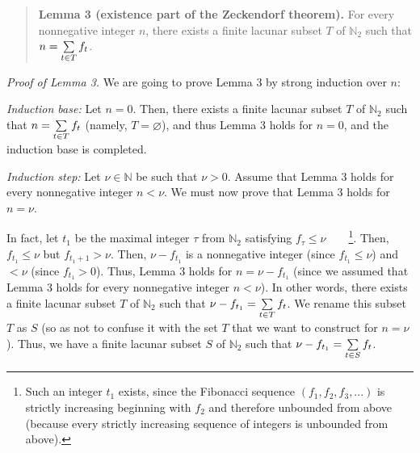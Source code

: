 \documentclass[numbers=enddot,12pt,final,onecolumn,notitlepage]{scrartcl}%
\numberwithin{exer}{section}
\theoremstyle{definition}
\let\sumnonlimits\sum
\renewcommand{\sum}{\sumnonlimits\limits}
\begin{document}
\begin{quote}
\textbf{Lemma 3 (existence part of the Zeckendorf theorem).} For every
nonnegative integer $n$, there exists a finite lacunar subset $T$ of
$\mathbb{N}_{2}$ such that $n=\sum\limits_{t\in T}f_{t}$.
\end{quote}

\textit{Proof of Lemma 3.} We are going to prove Lemma 3 by strong induction
over $n$:

\textit{Induction base:} Let $n=0$. Then, there exists a finite lacunar subset
$T$ of $\mathbb{N}_{2}$ such that $n=\sum\limits_{t\in T}f_{t}$ (namely,
$T=\varnothing$), and thus Lemma 3 holds for $n=0$, and the induction base is completed.

\textit{Induction step:} Let $\nu\in\mathbb{N}$ be such that $\nu>0$. Assume
that Lemma 3 holds for every nonnegative integer $n<\nu$. We must now prove
that Lemma 3 holds for $n=\nu$.

In fact, let $t_{1}$ be the maximal integer $\tau$ from $\mathbb{N}_{2}$
satisfying $f_{\tau}\leq\nu$\ \ \ \ \footnote{Such an integer $t_{1}$ exists,
since the Fibonacci sequence $\left(  f_{1},f_{2},f_{3},...\right)  $ is
strictly increasing beginning with $f_{2}$ and therefore unbounded from above
(because every strictly increasing sequence of integers is unbounded from
above).}. Then, $f_{t_{1}}\leq\nu$ but $f_{t_{1}+1}>\nu$. Then, $\nu-f_{t_{1}%
}$ is a nonnegative integer (since $f_{t_{1}}\leq\nu$) and $<\nu$ (since
$f_{t_{1}}>0$). Thus, Lemma 3 holds for $n=\nu-f_{t_{1}}$ (since we assumed
that Lemma 3 holds for every nonnegative integer $n<\nu$). In other words,
there exists a finite lacunar subset $T$ of $\mathbb{N}_{2}$ such that
$\nu-f_{t_{1}}=\sum\limits_{t\in T}f_{t}$. We rename this subset $T$ as $S$
(so as not to confuse it with the set $T$ that we want to construct for
$n=\nu$). Thus, we have a finite lacunar subset $S$ of $\mathbb{N}_{2}$ such
that $\nu-f_{t_{1}}=\sum\limits_{t\in S}f_{t}$.
\end{document}
